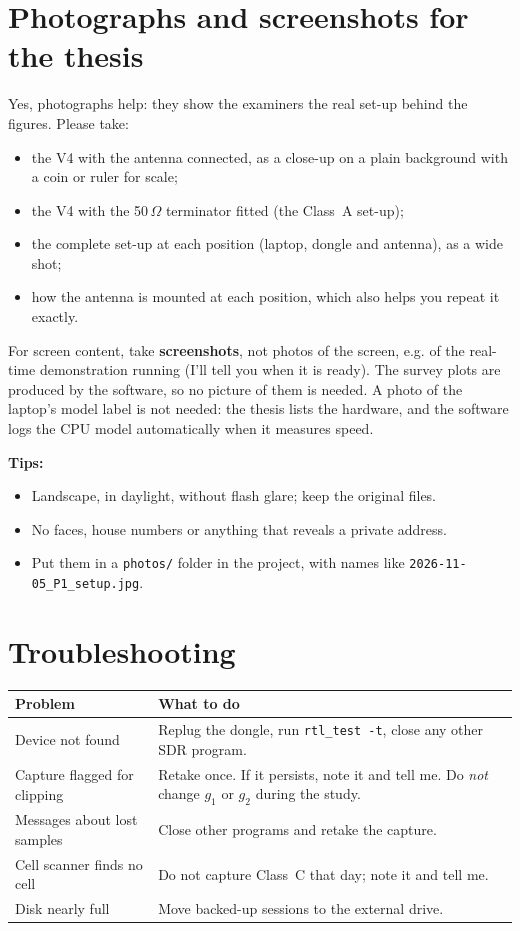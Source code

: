 \documentclass[11pt,a4paper]{article}
\newcommand{\cmd}[1]{\texttt{#1}}
\begin{document}
\section{Photographs and screenshots for the thesis}\label{sec:photos}
Yes, photographs help: they show the examiners the real set-up behind the figures. Please take:
\begin{itemize}
\item the V4 with the antenna connected, as a close-up on a plain background with a coin or ruler for scale;
\item the V4 with the 50\,$\Omega$ terminator fitted (the Class~A set-up);
\item the complete set-up at each position (laptop, dongle and antenna), as a wide shot;
\item how the antenna is mounted at each position, which also helps you repeat it exactly.
\end{itemize}
For screen content, take \textbf{screenshots}, not photos of the screen, e.g. of the real-time demonstration running (I'll tell you when it is ready). The survey plots are produced by the software, so no picture of them is needed. A photo of the laptop's model label is not needed: the thesis lists the hardware, and the software logs the CPU model automatically when it measures speed.

\textbf{Tips:}
\begin{itemize}
\item Landscape, in daylight, without flash glare; keep the original files.
\item No faces, house numbers or anything that reveals a private address.
\item Put them in a \cmd{photos/} folder in the project, with names like \cmd{2026-11-05\_P1\_setup.jpg}.
\end{itemize}

\section{Troubleshooting}
\begin{tabularx}{\linewidth}{@{} >{\raggedright\arraybackslash}p{4.6cm} X @{}}
\toprule
Problem & What to do \\
\midrule
Device not found & Replug the dongle, run \cmd{rtl\_test -t}, close any other SDR program. \\
Capture flagged for clipping & Retake once. If it persists, note it and tell me. Do \emph{not} change $g_1$ or $g_2$ during the study. \\
Messages about lost samples & Close other programs and retake the capture. \\
Cell scanner finds no cell & Do not capture Class~C that day; note it and tell me. \\
Disk nearly full & Move backed-up sessions to the external drive. \\
\bottomrule
\end{tabularx}
\end{document}
